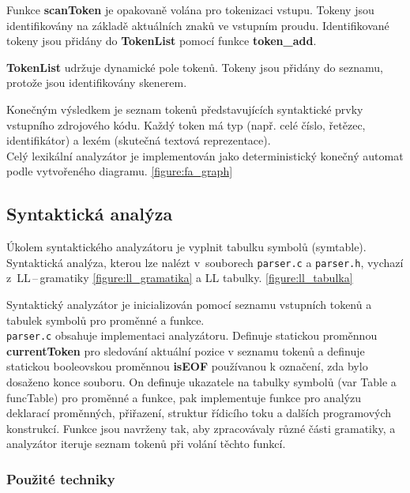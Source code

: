 \documentclass[a4paper, 11pt]{article}
\begin{document}
        Funkce \textbf{scanToken} je opakovaně volána pro tokenizaci vstupu.
        Tokeny jsou identifikovány na základě aktuálních znaků ve vstupním proudu.
        Identifikované tokeny jsou přidány do \textbf{TokenList} pomocí funkce \textbf{token\_add}.
        
        \textbf{TokenList} udržuje dynamické pole tokenů.
        Tokeny jsou přidány do seznamu, protože jsou identifikovány skenerem.
        
        Konečným výsledkem je seznam tokenů představujících syntaktické prvky vstupního zdrojového kódu.
        Každý token má typ (např. celé číslo, řetězec, identifikátor) a lexém (skutečná textová reprezentace).
        \\

	Celý lexikální analyzátor je implementován jako deterministický konečný automat podle vytvořeného diagramu. \ref{figure:fa_graph}


	\subsection{Syntaktická analýza}

        Úkolem syntaktického analyzátoru je vyplnit tabulku symbolů (symtable). Syntaktická analýza, kterou lze nalézt v~souborech \verb|parser.c| a \verb|parser.h|, vychazí z~LL\,--\,gramatiky \ref{figure:ll_gramatika} a LL tabulky. \ref{figure:ll_tabulka}



Syntaktický analyzátor je inicializován pomocí seznamu vstupních tokenů a tabulek symbolů pro proměnné a funkce.\\
\verb|parser.c| obsahuje implementaci analyzátoru.
Definuje statickou proměnnou \textbf{currentToken} pro sledování aktuální pozice v seznamu tokenů a definuje statickou booleovskou proměnnou \textbf{isEOF} používanou k označení, zda bylo dosaženo konce souboru.
On definuje ukazatele na tabulky symbolů (var Table a funcTable) pro proměnné a funkce, pak
implementuje funkce pro analýzu deklarací proměnných, přiřazení, struktur řídicího toku a dalších programových konstrukcí.
Funkce jsou navrženy tak, aby zpracovávaly různé části gramatiky, a analyzátor iteruje seznam tokenů při volání těchto funkcí.\\

\subsubsection{Použité techniky}
\end{document}
